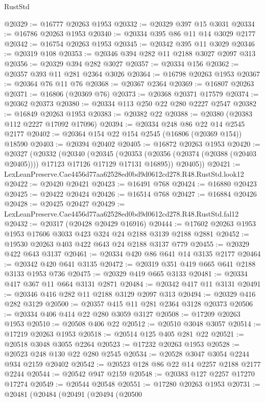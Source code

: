 \begin{lexlean}{RustStd}
\begin{coremodule}
@20329 := @16777 @20263 @1953
@20332 := @20329 @397 @15 @3031
@20334 := @16786 @20263 @1953
@20340 := @20334 @395 @86 @11 @14 @3029 @2177
@20342 := @16754 @20263 @1953
@20345 := @20342 @395 @11 @3029
@20346 := @20319 @108
@20353 := @20346 @394 @282 @11 @2188 @3027 @2097 @313
@20356 := @20329 @394 @282 @3027
@20357 := @20334 @156
@20362 := @20357 @393 @11 @281 @2364 @3026
@20364 := @16798 @20263 @1953
@20367 := @20364 @76 @11 @76
@20368 := @20367 @2364
@20369 := @16807 @20263
@20371 := @16806 (@20369 @76)
@20373 := @20368 @20371 @17579
@20374 := @20362 @20373
@20380 := @20334 @113 @250 @22 @280 @2227 @2547
@20382 := @16849 @20263 @1953
@20383 := @20382 @22
@20388 := @20380 (@20383 @112 @2227 @17092 @17096)
@20394 := @20334 @248 @86 @22 @14 @2545 @2177
@20402 := @20364 @154 @22 @154 @2545 (@16806 (@20369 @154)) @18590
@20403 := @20394 @20402
@20405 := @16872 @20263 @1953
@20420 := @20327
    (@20332
      (@20340
        (@20345
          (@20353 (@20356 (@20374 (@20388 (@20403 @20405)))) @17123 @17126 @17129 @17131 @16895))
        @20405))
@20421 := LexLeanPreserve.Cae4456d77aa62528ed0bd9d0612cd278.R48.RustStd.look12
@20422 := @20420 @20421
@20423 := @16491 @768
@20424 := @16880 @20423
@20425 := @20422 @20424
@20426 := @16514 @768
@20427 := @16884 @20426
@20428 := @20425 @20427
@20429 := LexLeanPreserve.Cae4456d77aa62528ed0bd9d0612cd278.R48.RustStd.fal12
@20432 := @20317 (@20428 @20429 @16916)
@20444 := @17602 @20263 @1953 @1953 @17606 @3033 @423 @324 @24 @2188 @3139 @2188 @2881
@20452 := @19530 @20263 @403 @422 @643 @24 @2188 @3137 @779
@20455 := @20329 @422 @643 @3137
@20461 := @20334 @420 @86 @641 @14 @3135 @2177
@20464 := @20342 @420 @641 @3135
@20472 := @20319 @351 @419 @665 @641 @2188 @3133 @1953 @736
@20475 := @20329 @419 @665 @3133
@20481 := @20334 @417 @367 @11 @664 @3131 @2871
@20484 := @20342 @417 @11 @3131
@20491 := @20346 @416 @282 @11 @2188 @3129 @2097 @313
@20494 := @20329 @416 @282 @3129
@20500 := @20357 @415 @11 @281 @2364 @3128 @20373
@20506 := @20334 @406 @414 @22 @280 @3059 @3127
@20508 := @17209 @20263 @1953
@20510 := @20508 @406 @22
@20512 := @20510 @3048 @3057
@20514 := @17219 @20263 @1953
@20518 := @20514 @125 @405 @281 @22
@20521 := @20518 @3048 @3055 @2264
@20523 := @17232 @20263 @1953
@20528 := @20523 @248 @130 @22 @280 @2545
@20534 := @20528 @3047 @3054 @2244 @934 @2159 @20402
@20542 := @20523 @128 @86 @22 @14 @2257 @2188 @2177 @2244
@20544 := @20542 @947 @2159
@20548 := @20383 @127 @2257 @17270 @17274
@20549 := @20544 @20548
@20551 := @17280 @20263 @1953
@20731 := @20481
    (@20484
      (@20491
        (@20494
          (@20500

\end{coremodule}
\end{lexlean}
